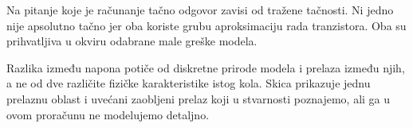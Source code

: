 Na pitanje koje je računanje tačno odgovor zavisi od tražene tačnosti. Ni jedno nije apsolutno tačno jer oba koriste grubu aproksimaciju rada tranzistora. Oba su prihvatljiva u okviru odabrane male greške modela.

Razlika između napona potiče od diskretne prirode modela i prelaza između njih, a ne od dve različite fizičke karakteristike istog kola. Skica prikazuje jednu prelaznu oblast i uvećani zaobljeni prelaz koji u stvarnosti poznajemo, ali ga u ovom proračunu ne modelujemo detaljno.
